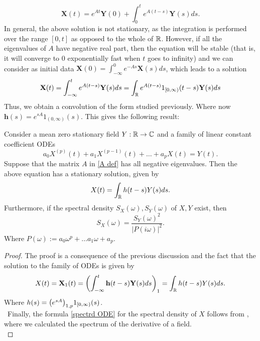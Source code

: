 \documentclass[
    a4paper,
    DIV=14,
    abstract=true,
    numbers=noenddot
]{scrartcl}
\begin{document}
\begin{equation*}
	\mathbf{X}(t)=e^{A t}\mathbf{Y}(0)+\int_{0}^t e^{A(t-s)}\mathbf{Y}(s)ds.
\end{equation*}
In general, the above solution is not stationary, as the integration is performed over the range $[0,t]$ as opposed to the whole of  $\mathbb{R}$. However, if all the eigenvalues of $A$ have negative real part, then the equation will be stable (that is, it will converge to $0$ exponentially fast when  $t$ goes to infinity) and we can consider as initial data $\mathbf{X}(0)=\int_{-\infty}^0 e^{-As}\mathbf{X}(s)ds$, which leads to a solution
\begin{equation*}
	\mathbf{X}(t)=\int_{-\infty}^t e^{A(t-s)}\mathbf{Y}(s)ds=\int_{\mathbb{R}} e^{A(t-s)}1_{[0,\infty)}(t-s)\mathbf{Y}(s)ds
\end{equation*}
Thus, we obtain a convolution of the form studied previously. Where now $\mathbf{h}(s)=e^{sA}1_{(0,\infty)}(s)$. This gives the following result:
\begin{proposition}
	Consider a mean zero stationary field $Y:\mathbb{R}\to\mathbb{C}$ and a family of linear constant coefficient ODEs
	\begin{equation*}
		a_0X^{(p)}(t)+a_1X^{(p-1)}(t)+\ldots+a_pX(t)=Y(t).
	\end{equation*}
	Suppose that the matrix $A$ in \eqref{A def}  has all negative eigenvalues. Then the above equation has a stationary solution, given by
	\begin{equation*}
		X(t)=\int_{\mathbb{R}} h(t-s){Y}(s)ds.
	\end{equation*}
	Furthermore, if the spectral density $S_X(\omega),S_Y(\omega)$ of $X,Y$ exist, then
	\begin{equation}\label{spectrd ODE}
		S_X(\omega)=\frac{S_Y(\omega)^2}{|P(i\omega)|^2}.
	\end{equation}
	Where $P(\omega):=a_0\omega^p+\ldots a_{1}\omega+a_p$.
\end{proposition}
\begin{proof}
	The proof is a consequence of the previous discussion and the fact that the solution to the family of ODEs is given by
	\begin{equation*}
		X(t)=\mathbf{X}_1(t)=\qty(\int_{-\infty}^t \mathbf{h}(t-s)\mathbf{Y}(s)ds)_1=\int_{\mathbb{R}} h(t-s)Y(s)ds.
	\end{equation*}
	Where $h(s)=\qty(e^{sA})_{1,p}1_{[0,\infty)}(s)$.\\
	\
	Finally, the formula \eqref{spectrd ODE} for the spectral density of $X$ follows from , where we calculated the spectrum of the derivative of a field.\\
\end{proof}
\end{document}
